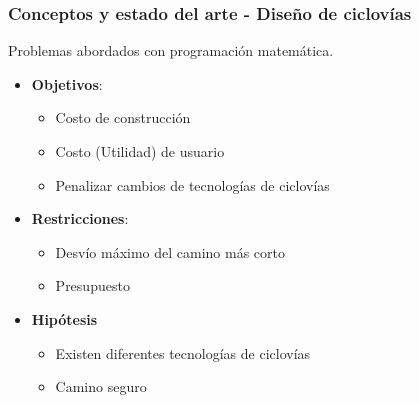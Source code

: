 \documentclass[aspectratio=43, 10pt]{beamer}
\begin{document}
\begin{frame}
    \frametitle{Conceptos y estado del arte - Diseño de ciclovías}

    Problemas abordados con programación matemática.

\begin{itemize} \item{
        \textbf{Objetivos}:
        \begin{itemize}
            \item{Costo de construcción \parencite{Duthie2014}}
            \item{Costo (Utilidad) de usuario \parencite{Mauttone2017, Liu2019, baya2021}}
            \item{Penalizar cambios de tecnologías de ciclovías \parencite{baya2021}}
        \end{itemize}
    }
    \item{
        \textbf{Restricciones}:
        \begin{itemize}
            \item{Desvío máximo del camino más corto \parencite{Duthie2014, lim2021}}
        \item{Presupuesto}
        \end{itemize}
    }
    \item{
        \textbf{Hipótesis}
        \begin{itemize}
            \item{Existen diferentes tecnologías de ciclovías \parencite{baya2021, Zhu2019}}
            \item{Camino seguro \parencite{Duthie2014, lim2021}}
        \end{itemize}
    }
    \end{itemize}
\end{frame}

\end{document}
